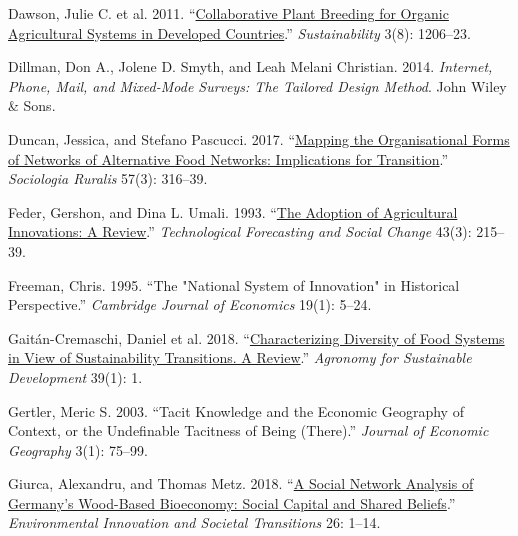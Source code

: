 \documentclass[twoside,12pt,final]{ucthesis-CA2012}
\newlength{\cslhangindent}
\newenvironment{CSLReferences}[2] %
 {%
  \setlength{\parindent}{0pt}
  \ifodd #1 \everypar{\setlength{\hangindent}{\cslhangindent}}\ignorespaces\fi
  \ifnum #2 > 0
  \setlength{\parskip}{#2\baselineskip}
  \fi
 }%
 {}
\begin{document}
\begin{ucmainmatter}
\begin{CSLReferences}{1}{0}
\leavevmode{}%
Dawson, Julie C. et al. 2011. {``\href{https://doi.org/10.3390/su3081206}{Collaborative Plant Breeding for Organic Agricultural Systems in Developed Countries}.''} \emph{Sustainability} 3(8): 1206--23.

\leavevmode{}%
Dillman, Don A., Jolene D. Smyth, and Leah Melani Christian. 2014. \emph{Internet, Phone, Mail, and Mixed-Mode Surveys: The Tailored Design Method}. John Wiley \& Sons.

\leavevmode{}%
Duncan, Jessica, and Stefano Pascucci. 2017. {``\href{https://doi.org/10.1111/soru.12167}{Mapping the Organisational Forms of Networks of Alternative Food Networks: Implications for Transition}.''} \emph{Sociologia Ruralis} 57(3): 316--39.

\leavevmode{}%
Feder, Gershon, and Dina L. Umali. 1993. {``\href{https://doi.org/10.1016/0040-1625(93)90053-A}{The Adoption of Agricultural Innovations: A Review}.''} \emph{Technological Forecasting and Social Change} 43(3): 215--39.

\leavevmode{}%
Freeman, Chris. 1995. {``The "National System of Innovation" in Historical Perspective.''} \emph{Cambridge Journal of Economics} 19(1): 5--24.

\leavevmode{}%
Gaitán-Cremaschi, Daniel et al. 2018. {``\href{https://doi.org/10.1007/s13593-018-0550-2}{Characterizing Diversity of Food Systems in View of Sustainability Transitions. A Review}.''} \emph{Agronomy for Sustainable Development} 39(1): 1.

\leavevmode{}%
Gertler, Meric S. 2003. {``Tacit Knowledge and the Economic Geography of Context, or the Undefinable Tacitness of Being (There).''} \emph{Journal of Economic Geography} 3(1): 75--99.

\leavevmode{}%
Giurca, Alexandru, and Thomas Metz. 2018. {``\href{https://doi.org/10.1016/j.eist.2017.09.001}{A Social Network Analysis of Germany's Wood-Based Bioeconomy: Social Capital and Shared Beliefs}.''} \emph{Environmental Innovation and Societal Transitions} 26: 1--14.


\end{CSLReferences}
\end{ucmainmatter}
\end{document}
